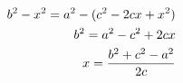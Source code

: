 \documentclass[preview]{standalone}
\begin{document}
\begin{align*}
\special{dvisvgm:raw <g id='unique000'>}b^2 - x^2 = a^2 - (c^2 - 2cx + x^2)\\ \special{dvisvgm:raw </g>}\special{dvisvgm:raw <g id='unique001'>}b^2 = a^2 - c^2 + 2cx\\ \special{dvisvgm:raw </g>}\special{dvisvgm:raw <g id='unique002'>}x = \frac{b^2 + c^2 - a^2}{2c}\special{dvisvgm:raw </g>}
\end{align*}
\end{document}
